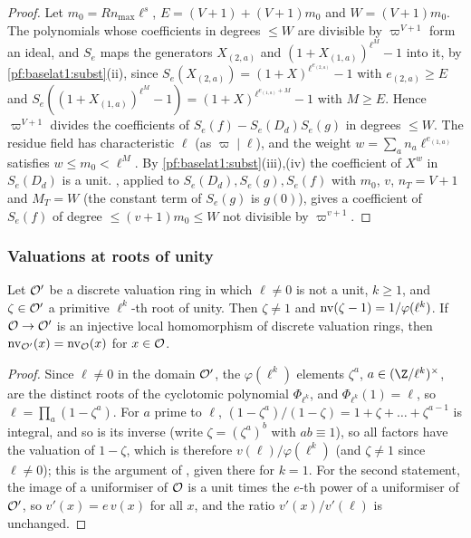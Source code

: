 \begin{proof}
Let $m_0=Rn_{\max}\ell^s$, $E=(V+1)+(V+1)m_0$ and $W=(V+1)m_0$. The polynomials whose coefficients in degrees $\le W$ are
divisible by $\varpi^{V+1}$ form an ideal, and $S_e$ maps the generators $X_{(2,a)}$ and $(1+X_{(1,a)})^{\ell^M}-1$ into it,
by \cref{pf:baselat1:subst}(ii), since $S_e(X_{(2,a)})=(1+X)^{\ell^{e_{(2,a)}}}-1$ with $e_{(2,a)}\ge E$ and
$S_e((1+X_{(1,a)})^{\ell^M}-1)=(1+X)^{\ell^{e_{(1,a)}+M}}-1$ with $M\ge E$. Hence $\varpi^{V+1}$ divides the coefficients of
$S_e(f)-S_e(D_d)S_e(g)$ in degrees $\le W$. The residue field has characteristic $\ell$ (as $\varpi\mid\ell$), and the
weight $w=\sum_an_a\ell^{e_{(1,a)}}$ satisfies $w\le m_0<\ell^M$. By \cref{pf:baselat1:subst}(iii),(iv) the coefficient of
$X^w$ in $S_e(D_d)$ is a unit. , applied to $S_e(D_d),S_e(g),S_e(f)$ with $m_0$, $v$,
$n_T=V+1$ and $M_T=W$ (the constant term of $S_e(g)$ is $g(0)$), gives a coefficient of $S_e(f)$ of degree
$\le(v+1)m_0\le W$ not divisible by $\varpi^{v+1}$.
\end{proof}

\subsubsection{Valuations at roots of unity}

\begin{lemma}\label{pf:baselat1:rootval}
Let $\mathcal O'$ be a discrete valuation ring in which $\ell\neq0$ is not a unit, $k\ge1$, and $\zeta\in\mathcal O'$ a
primitive $\ell^k$-th root of unity. Then $\zeta\ne1$ and $\operatorname{nv}(\zeta-1)=1/\varphi(\ell^k)$. If
$\mathcal O\to\mathcal O'$ is an injective local homomorphism of discrete valuation rings, then
$\operatorname{nv}_{\mathcal O'}(x)=\operatorname{nv}_{\mathcal O}(x)$ for $x\in\mathcal O$.
\end{lemma}

\begin{proof}
Since $\ell\ne0$ in the domain $\mathcal O'$, the $\varphi(\ell^k)$ elements $\zeta^a$, $a\in(\Z/\ell^k)^\times$, are the
distinct roots of the cyclotomic polynomial $\Phi_{\ell^k}$, and $\Phi_{\ell^k}(1)=\ell$, so
$\ell=\prod_a(1-\zeta^a)$. For $a$ prime to $\ell$, $(1-\zeta^a)/(1-\zeta)=1+\zeta+\dots+\zeta^{a-1}$ is integral, and so is
its inverse (write $\zeta=(\zeta^a)^b$ with $ab\equiv1$), so all factors have the valuation of $1-\zeta$, which is therefore
$v(\ell)/\varphi(\ell^k)$ (and $\zeta\ne1$ since $\ell\ne0$); this is the argument of \cite[Lemma~1.4]{Washington1997},
given there for $k=1$. For the second statement,
the image of a uniformiser of $\mathcal O$ is a unit times the $e$-th power of a uniformiser of $\mathcal O'$, so
$v'(x)=e\,v(x)$ for all $x$, and the ratio $v'(x)/v'(\ell)$ is unchanged.
\end{proof}

